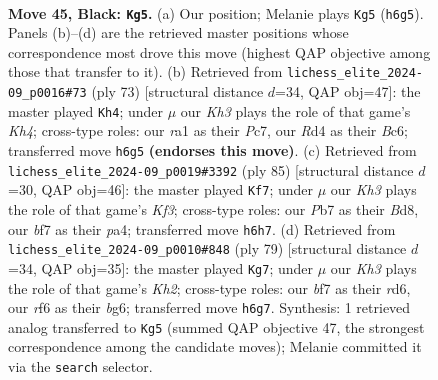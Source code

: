 \documentclass[11pt]{article}
\begin{document}
\clearpage

\begin{figure}[p]\centering
\begin{subfigure}{0.46\textwidth}\centering
\resizebox{\linewidth}{!}{%
\newchessgame
\chessboard[
  setfen={r7/1p3B2/p4R1k/4P2p/bP1r4/P6K/8/R7 b - - 4 45},
  showmover=false,
  pgfstyle=straightmove, color=movearrow, markmove={h6-g5}
]}
\caption{}
\end{subfigure}\hfill
\begin{subfigure}{0.46\textwidth}\centering
\resizebox{\linewidth}{!}{%
\newchessgame
\chessboard[
  setfen={8/1pp5/2bp1r2/p5pk/P7/1P2K1R1/2P1B3/8 b - - 11 37},
  showmover=false,
  pgfstyle=straightmove, color=movearrow, markmove={h5-h4}
]}
\caption{}
\end{subfigure}
\\[4pt]
\begin{subfigure}{0.46\textwidth}\centering
\resizebox{\linewidth}{!}{%
\newchessgame
\chessboard[
  setfen={r2b4/8/5k2/5p1p/P1R3p1/2B3P1/4K2P/8 b - - 7 43},
  showmover=false,
  pgfstyle=straightmove, color=movearrow, markmove={f6-f7}
]}
\caption{}
\end{subfigure}\hfill
\begin{subfigure}{0.46\textwidth}\centering
\resizebox{\linewidth}{!}{%
\newchessgame
\chessboard[
  setfen={8/7k/1p1R2B1/2p4p/2Pb1P1P/1r4P1/7K/8 b - - 0 40},
  showmover=false,
  pgfstyle=straightmove, color=movearrow, markmove={h7-g7}
]}
\caption{}
\end{subfigure}
\caption{\textbf{Move 45, Black: \texttt{Kg5}.} (a) Our position; Melanie plays \texttt{Kg5} (\texttt{h6g5}). Panels (b)--(d) are the retrieved master positions whose correspondence most drove this move (highest QAP objective among those that transfer to it). (b) Retrieved from \texttt{lichess\_elite\_2024-09\_p0016\#73} (ply 73) [structural distance $d$=34, QAP obj=47]: the master played \texttt{Kh4}; under $\mu$ our \emph{Kh3} plays the role of that game's \emph{Kh4}; cross-type roles: our \emph{r}a1 as their \emph{P}c7, our \emph{R}d4 as their \emph{B}c6; transferred move \texttt{h6g5} \textbf{(endorses this move)}. (c) Retrieved from \texttt{lichess\_elite\_2024-09\_p0019\#3392} (ply 85) [structural distance $d$=30, QAP obj=46]: the master played \texttt{Kf7}; under $\mu$ our \emph{Kh3} plays the role of that game's \emph{Kf3}; cross-type roles: our \emph{P}b7 as their \emph{B}d8, our \emph{b}f7 as their \emph{p}a4; transferred move \texttt{h6h7}. (d) Retrieved from \texttt{lichess\_elite\_2024-09\_p0010\#848} (ply 79) [structural distance $d$=34, QAP obj=35]: the master played \texttt{Kg7}; under $\mu$ our \emph{Kh3} plays the role of that game's \emph{Kh2}; cross-type roles: our \emph{b}f7 as their \emph{r}d6, our \emph{r}f6 as their \emph{b}g6; transferred move \texttt{h6g7}. Synthesis: 1 retrieved analog transferred to \texttt{Kg5} (summed QAP objective 47, the strongest correspondence among the candidate moves); Melanie committed it via the \texttt{search} selector.}
\label{fig:thought-m89}
\end{figure}
\end{document}
